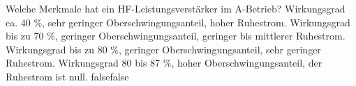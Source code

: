     {Welche Merkmale hat ein HF-Leistungsverstärker im A-Betrieb?}
    {Wirkungsgrad ca. 40 \%, sehr geringer Oberschwingungsanteil, hoher Ruhestrom.}
    {Wirkungsgrad bis zu 70 \%, geringer Oberschwingungsanteil, geringer bis mittlerer Ruhestrom.}
    {Wirkungsgrad bis zu 80 \%, geringer Oberschwingungsanteil, sehr geringer Ruhestrom.}
    {Wirkungsgrad 80 bis 87 \%, hoher Oberschwingungsanteil, der Ruhestrom ist null.}
    {false}{false}